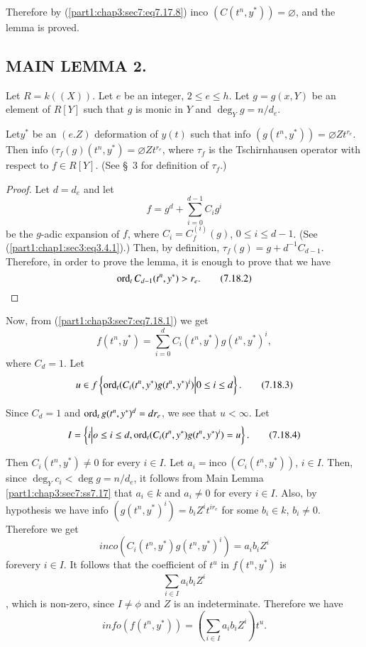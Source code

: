 Therefore by (\ref{part1:chap3:sec7:eq7.17.8}) inco $(C(t^n, y^*))= \diameter$, and the lemma is proved.

\subsection{\textbf{MAIN LEMMA 2.}}\label{part1:chap3:sec7:ss7.18}

Let $R= k((X))$. Let $e$ be an integer, $2 \leq e \leq h$. Let $g=g(x, Y)$ be an element of $R[Y]$ such that $g$ is monic in $Y$ and $\deg_Y g= n/d_e$.

Let\pageoriginale $y^*$ be an $(e. Z)$ deformation of $y(t)$ such that info $(g(t^n, y^*))= \diameter Zt^{r_e}$. Then info $(\tau_f(g) (t^n, y^*)= \diameter Z t^{r_e}$, where $\tau_f$ is the Tschirnhausen operator with respect to $f \in R[Y]$. (See \S\ 3 for definition of $\tau_f$.)

\begin{proof}
Let $d= d_e$ and let 
\begin{equation*}
  f =g^d + \sum^{d-1}_{i=0} C_i g^i \tag{7.18.1} \label{part1:chap3:sec7:eq7.18.1} 
\end{equation*}
be the $g$-adic expansion of $f$, where $C_i= C_f^{(i)}(g)$, $0 \leq i \leq d-1$. (See (\ref{part1:chap1:sec3:eq3.4.1}).) Then, by definition, $\tau_f(g)= g+ d^{-1} C_{d-1}$. Therefore, in order to prove the lemma, it is enough to prove that we have
\begin{equation*}
  \operatorname{ord}_t C_{d-1} (t^n , y^*)>r_e. \tag{7.18.2} \label{part1:chap3:sec7:eq7.18.2} 
\end{equation*}
\end{proof}

Now, from (\ref{part1:chap3:sec7:eq7.18.1}) we get
$$
f(t^n, y^*) = \sum^d_{i=0} C_i (t^n, y^*) g(t^n, y^*)^i,
$$
where $C_d=1$. Let
\begin{equation*}
u \in f\left\{ \operatorname{ord}_t (C_i (t^n, y^*) g(t^n, y^*)^i)\Big| 0 \leq i \leq d\right\}.\tag{7.18.3} \label{part1:chap3:sec7:eq7.18.3} 
\end{equation*}

Since $C_d=1$ and $\operatorname{ord}_t g(t^n, y^*)^d= dr_e$, we see that $u < \infty$. Let
\begin{equation*}
  I = \left\{ i \Big| o \leq i \leq d, \operatorname{ord}_t (C_i (t^n, y^*) g(t^n, y^*)^i)=u \right\}.\tag{7.18.4} \label{part1:chap3:sec7:eq7.18.4} 
\end{equation*}

Then $C_i (t^n, y^*)\neq 0$ for every $i \in I$. Let $a_i = \text{inco}~ (C_i (t^n, y^*))$, $i \in I$. Then, since $\deg_Y c_i < \deg g = n/d_e$, it follows from Main Lemma \ref{part1:chap3:sec7:ss7.17} that $a_i \in k$ and $a_i \neq 0$ for every $i \in I$. Also, by hypothesis we have info $(g(t^n, y^*)^i)= b_i Z^i t^{ir_e}$ for some $b_i \in k$, $b_i \neq 0$. Therefore we get
$$
inco (C_i (t^n, y^*) g(t^n, y^*)^i) = a_i b_i Z^i
$$
for\pageoriginale every $i \in I$. It follows that the coefficient of
$t^u$ in $f(t^n, y^*)$ is 
$$\sum_{i \in I} a_i b_i Z^i$$, 
which is non-zero, since $I \neq \phi$ and $Z$ is an indeterminate. Therefore we have
$$
info (f(t^n, y^*)) = \left( \sum_{i \in I} a_i b_i Z^i\right)t^u.
$$


